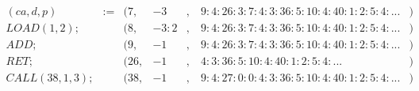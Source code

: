 
\begin{equation*}
\begin{aligned}
(ca, d, p) 		 &:= & (7, &-3&, &\:9 : 4 : 26 : 3 : 7 : 4 : 3 : 36 : 5 : 10 : 4 : 40 : 1 : 2 : 5 : 4 :...&) \\
LOAD(1, 2); 	 & & (8, &-3 : 2&, &\:9 : 4 : 26 : 3 : 7 : 4 : 3 : 36 : 5 : 10 : 4 : 40 : 1 : 2 : 5 : 4 :...&) \\
ADD; 			 & & (9, &-1&, &\:9 : 4 : 26 : 3 : 7 : 4 : 3 : 36 : 5 : 10 : 4 : 40 : 1 : 2 : 5 : 4 :...&) \\
RET; 			 & & (26, &-1&, &\:4 : 3 : 36 : 5 : 10 : 4 : 40 : 1 : 2 : 5 : 4 :...&) \\
CALL(38, 1, 3); & & (38, &-1&, &\:9 : 4 : 27 : 0 : 0 : 4 : 3 : 36 : 5 : 10 : 4 : 40 : 1 : 2 : 5 : 4 :...&) \\
\end{aligned}
\end{equation*}